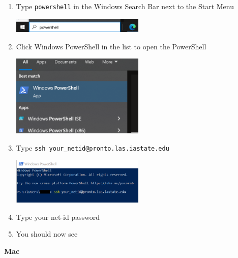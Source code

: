 \documentclass[
]{book}
\newenvironment{Shaded}{\begin{snugshade}}{\end{snugshade}}
\newcommand{\ExtensionTok}[1]{#1}
\newcommand{\NormalTok}[1]{#1}
\begin{document}
\begin{enumerate}
\def\labelenumi{\arabic{enumi}.}
\item
  Type \texttt{powershell} in the Windows Search Bar next to the Start Menu

  \includegraphics[width=0.5\textwidth,height=0.5\textheight]{images/windows_search_bar.png}
\item
  Click Windows PowerShell in the list to open the PowerShell

  \includegraphics[width=0.5\textwidth,height=0.5\textheight]{images/powershell.png}
\item
  Type \texttt{ssh\ your\_netid@pronto.las.iastate.edu}

  \includegraphics[width=0.5\textwidth,height=0.5\textheight]{images/ssh_to_pronto.png}
\item
  Type your net-id password
\item
  You should now see

\begin{Shaded}
\end{Shaded}
\end{enumerate}

\textbf{Mac}
\end{document}
